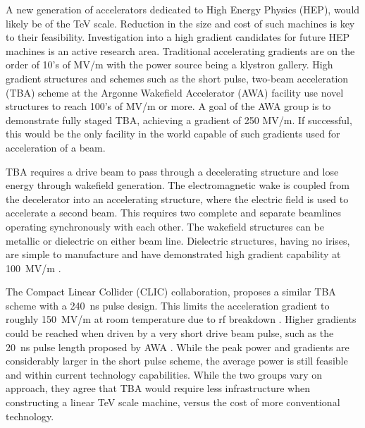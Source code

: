  \label{sec:motivation}

A new generation of accelerators dedicated to High Energy Physics
(HEP), would likely be of the TeV scale. Reduction in the size and cost
of such machines is key to their feasibility. 
Investigation into a high gradient candidates for future HEP machines is an active research area. 
Traditional accelerating gradients are on the order of 10's of MV/m
with the power source being a klystron gallery.
High gradient structures and schemes such as the 
short pulse, two-beam acceleration (TBA) scheme 
at the Argonne Wakefield Accelerator (AWA) facility
use novel structures to reach 100's of MV/m or more. 
A goal of the AWA group is to demonstrate fully staged TBA, 
achieving a gradient of 250 MV/m. If successful, this would
be the only facility in the world capable of such gradients used for
acceleration of a beam.

TBA requires a drive beam to pass through a decelerating structure and
lose energy through wakefield generation. The electromagnetic wake
is coupled from the decelerator into an accelerating structure, where
the electric field is used to accelerate a second beam. 
This requires two complete and separate beamlines 
operating synchronously with each other.  
The wakefield structures can be metallic or dielectric on either beam line. 
Dielectric structures, having no irises, are simple to manufacture and have demonstrated
high gradient capability at \SI{100}{MV/m} \cite{WeiPaper}. 

The Compact Linear Collider (CLIC) collaboration, proposes a similar TBA scheme with
a \SI{240}{ns} pulse design. This limits the acceleration gradient
to roughly \SI{150}{MV/m} at room temperature due to rf breakdown \cite{CLICdesignReport}.
Higher gradients could be reached when driven by a very short drive
beam pulse, such as the \SI{20}{ns} pulse length proposed by AWA \cite{WeiPaper}. 
While the peak power and gradients are considerably larger in the short pulse scheme, 
the average power is still feasible and within current technology capabilities.
While the two groups vary on approach, they agree that TBA would 
require less infrastructure when constructing a linear TeV scale machine, 
versus the cost of more conventional technology. 

